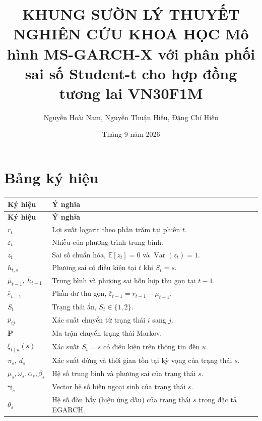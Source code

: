 \documentclass[12pt,a4paper]{article}
\title{\Large \textbf{KHUNG SƯỜN LÝ THUYẾT NGHIÊN CỨU KHOA HỌC} Mô hình MS-GARCH-X với phân phối sai số Student-t cho hợp đồng tương lai VN30F1M\\
}
\author{Nguyễn Hoài Nam, Nguyễn Thuận Hiếu, Đặng Chí Hiếu}
\date{\normalsize Tháng 9 năm 2026}
\numberwithin{equation}{section}
\theoremstyle{definition}
\newcommand{\E}{\mathbb{E}}
\newcommand{\Var}{\operatorname{Var}}
\newcommand{\Pmat}{\symbf{P}}
\newcommand{\bmgamma}{\symbf{\gamma}}
\begin{document}
	\maketitle
	\thispagestyle{empty}
	\newpage
	\section*{Bảng ký hiệu}
	
	{\footnotesize
		\begin{longtable}{@{}p{3.0cm}>{\raggedright\arraybackslash}p{12.2cm}@{}}
			\toprule
			\textbf{Ký hiệu} & \textbf{Ý nghĩa} \\
			\midrule
			\endfirsthead
			\toprule
			\textbf{Ký hiệu} & \textbf{Ý nghĩa} \\
			\midrule
			\endhead
			\bottomrule
			\endfoot
			$r_t$ & Lợi suất logarit theo phần trăm tại phiên $t$. \\
			$\varepsilon_t$ & Nhiễu của phương trình trung bình. \\
			$z_t$ & Sai số chuẩn hóa, $\E[z_t]=0$ và $\Var(z_t)=1$. \\
			$h_{t,s}$ & Phương sai có điều kiện tại $t$ khi $S_t=s$. \\
			$\bar\mu_{t-1},\ \bar h_{t-1}$ & Trung bình và phương sai hỗn hợp thu gọn tại $t-1$. \\
			$\bar\varepsilon_{t-1}$ & Phần dư thu gọn, $\bar\varepsilon_{t-1}=r_{t-1}-\bar\mu_{t-1}$. \\
			$S_t$ & Trạng thái ẩn, $S_t\in\{1,2\}$. \\
			$p_{ij}$ & Xác suất chuyển từ trạng thái $i$ sang $j$. \\
			$\Pmat$ & Ma trận chuyển trạng thái Markov. \\
			$\xi_{t\mid u}(s)$ & Xác suất $S_t=s$ có điều kiện trên thông tin đến $u$. \\
			$\pi_s,\ d_s$ & Xác suất dừng và thời gian tồn tại kỳ vọng của trạng thái $s$. \\
			$\mu_s,\omega_s,\alpha_s,\beta_s$ & Hệ số trung bình và phương sai của trạng thái $s$. \\
			$\bmgamma_s$ & Vector hệ số biến ngoại sinh của trạng thái $s$. \\
			$\theta_s$ & Hệ số đòn bẩy (hiệu ứng dấu) của trạng thái $s$ trong đặc tả EGARCH. \\

\end{longtable}}
\end{document}
